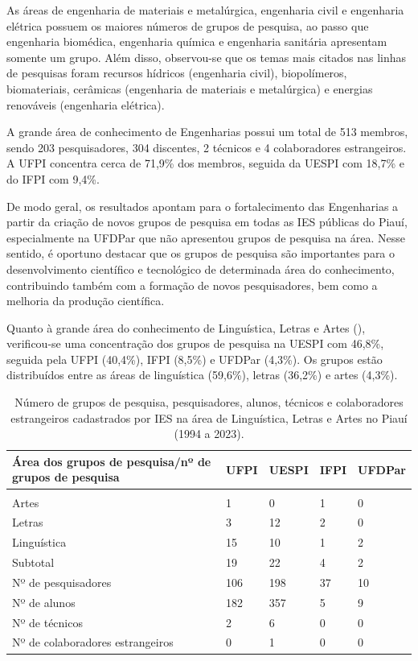 \documentclass[portuguese]{textolivre}
\begin{document}
As áreas de engenharia de materiais e metalúrgica, engenharia civil e engenharia elétrica possuem os maiores números de grupos de pesquisa, ao passo que engenharia biomédica, engenharia química e engenharia sanitária apresentam somente um grupo. Além disso, observou-se que os temas mais citados nas linhas de pesquisas foram recursos hídricos (engenharia civil), biopolímeros, biomateriais, cerâmicas (engenharia de materiais e metalúrgica) e energias renováveis (engenharia elétrica).

A grande área de conhecimento de Engenharias possui um total de 513 membros, sendo 203 pesquisadores, 304 discentes, 2 técnicos e 4 colaboradores estrangeiros. A UFPI concentra cerca de 71,9\% dos membros, seguida da UESPI com 18,7\% e do IFPI com 9,4\%. 

De modo geral, os resultados apontam para o fortalecimento das Engenharias a partir da criação de novos grupos de pesquisa em todas as IES públicas do Piauí, especialmente na UFDPar que não apresentou grupos de pesquisa na área. Nesse sentido, é oportuno destacar que os grupos de pesquisa são importantes para o desenvolvimento científico e tecnológico de determinada área do conhecimento, contribuindo também com a formação de novos pesquisadores, bem como a melhoria da produção científica.

Quanto à grande área do conhecimento de Linguística, Letras e Artes (), verificou-se uma concentração dos grupos de pesquisa na UESPI com 46,8\%, seguida pela UFPI (40,4\%), IFPI (8,5\%) e UFDPar (4,3\%). Os grupos estão distribuídos entre as áreas de linguística (59,6\%), letras (36,2\%) e artes (4,3\%).

\begin{table}[htbp]
\centering
\begin{threeparttable}
\caption{Número de grupos de pesquisa, pesquisadores, alunos, técnicos e colaboradores estrangeiros cadastrados por IES na área de Linguística, Letras e Artes no Piauí (1994 a 2023).}
\label{tbl11}
\begin{tabular}{>{\raggedright\arraybackslash}p{5cm} l l l l}
\toprule
Área dos grupos de pesquisa/nº de grupos de pesquisa & UFPI & UESPI & IFPI & UFDPar \\ 
\midrule
\multicolumn{5}{c}{Linguística, Letras e Artes} \\
\midrule
Artes & 1 & 0 & 1 & 0 \\
Letras & 3 & 12 & 2 & 0 \\
Linguística & 15 & 10 & 1 & 2 \\
\midrule
Subtotal & 19 & 22 & 4 & 2 \\
\midrule
Nº de pesquisadores & 106 & 198 & 37 & 10 \\
Nº de alunos & 182 & 357 & 5 & 9 \\
Nº de técnicos & 2 & 6 & 0 & 0 \\
Nº de colaboradores estrangeiros & 0 & 1 & 0 & 0 \\
\bottomrule
\end{tabular}
\end{threeparttable}
\end{table}
\end{document}
